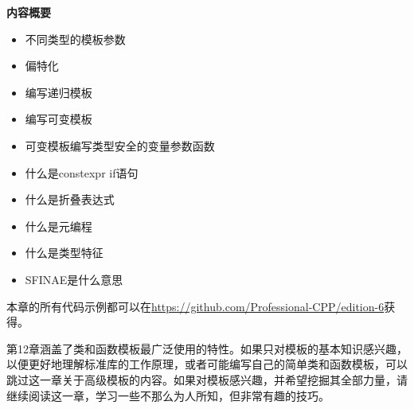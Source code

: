 \noindent
\textbf{内容概要}

\begin{itemize}
\item
不同类型的模板参数

\item
偏特化

\item
编写递归模板

\item
编写可变模板

\item
可变模板编写类型安全的变量参数函数

\item
什么是constexpr if语句

\item
什么是折叠表达式

\item
什么是元编程

\item
什么是类型特征

\item
SFINAE是什么意思
\end{itemize}

本章的所有代码示例都可以在\url{https://github.com/Professional-CPP/edition-6}获得。

第12章涵盖了类和函数模板最广泛使用的特性。如果只对模板的基本知识感兴趣，以便更好地理解标准库的工作原理，或者可能编写自己的简单类和函数模板，可以跳过这一章关于高级模板的内容。如果对模板感兴趣，并希望挖掘其全部力量，请继续阅读这一章，学习一些不那么为人所知，但非常有趣的技巧。



















